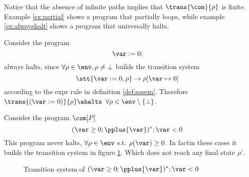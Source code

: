 Notice that the absence of infinite paths implies that
\(\trans{\com}{\rho}\) is finite.  Example \ref{ex:partial} shows a
program that partially loops, while example \ref{ex:alwayshalt} shows
a program that universally halts.


\begin{example}\label{ex:alwayshalt}
  Consider the program
  \begin{equation*}
    \var := 0;
  \end{equation*}
  always halts, since \(\forall\rho \in \env, \rho \neq \bot\) builds
  the transition system \[\stt{\var := 0, \rho} \to \rho[\var \mapsto
    0]\] according to the expr rule in definition
  \ref{def:sosem}. Therefore \(\trans{(\var := 0)}{\rho} \ahalts\)
  \(\forall \rho \in \env\setminus\{\bot\}\).
\end{example}

\begin{example}\label{ex:neverhalts}
  Consider the program \(\com[P]\) \[(\var \geq 0;
  \pplus{\var})^*;\var < 0\] This program never halts, \(\forall \rho
  \in \env\) s.t. \(\rho(\var) \geq 0\). In factin these cases it
  builds the transition system in figure \ref{fig:tsysnhalt}. Which
  does not reach any final state \(\rho'\).
  \begin{figure}
    \caption{Transition system of \((\var \geq 0; \pplus{\var})^*;\var
      < 0\)}\label{fig:tsysnhalt}
  \end{figure}
\end{example}

